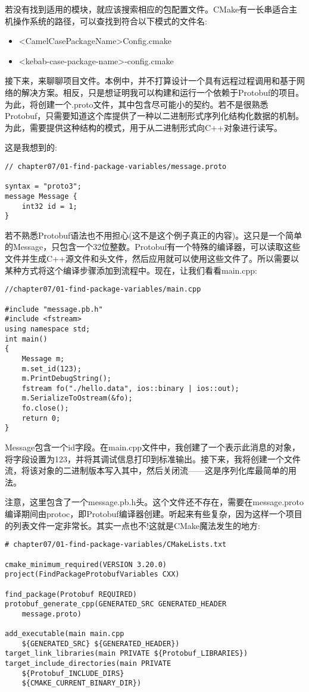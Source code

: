 若没有找到适用的模块，就应该搜索相应的包配置文件。CMake有一长串适合主机操作系统的路径，可以查找到符合以下模式的文件名:

\begin{itemize}
\item 
<CamelCasePackageName>Config.cmake

\item 
<kebab-case-package-name>-config.cmake
\end{itemize}

接下来，来聊聊项目文件。本例中，并不打算设计一个具有远程过程调用和基于网络的解决方案。相反，只是想证明我可以构建和运行一个依赖于Protobuf的项目。为此，将创建一个.proto文件，其中包含尽可能小的契约。若不是很熟悉Protobuf，只需要知道这个库提供了一种以二进制形式序列化结构化数据的机制。为此，需要提供这种结构的模式，用于从二进制形式向C++对象进行读写。

这是我想到的:

\begin{lstlisting}[style=styleCXX]
// chapter07/01-find-package-variables/message.proto

syntax = "proto3";
message Message {
	int32 id = 1;
}
\end{lstlisting}

若不熟悉Protobuf语法也不用担心(这不是这个例子真正的内容)。这只是一个简单的Message，只包含一个32位整数。Protobuf有一个特殊的编译器，可以读取这些文件并生成C++源文件和头文件，然后应用就可以使用这些文件了。所以需要以某种方式将这个编译步骤添加到流程中。现在，让我们看看main.cpp:

\begin{lstlisting}[style=styleCXX]
//chapter07/01-find-package-variables/main.cpp

#include "message.pb.h"
#include <fstream>
using namespace std;
int main()
{
	Message m;
	m.set_id(123);
	m.PrintDebugString();
	fstream fo("./hello.data", ios::binary | ios::out);
	m.SerializeToOstream(&fo);
	fo.close();
	return 0;
}
\end{lstlisting}

Message包含一个id字段。在main.cpp文件中，我创建了一个表示此消息的对象，将字段设置为123，并将其调试信息打印到标准输出。接下来，我将创建一个文件流，将该对象的二进制版本写入其中，然后关闭流——这是序列化库最简单的用法。

注意，这里包含了一个message.pb.h头。这个文件还不存在，需要在message.proto编译期间由protoc，即Protobuf编译器创建。听起来有些复杂，因为这样一个项目的列表文件一定非常长。其实一点也不!这就是CMake魔法发生的地方:

\begin{lstlisting}[style=styleCMake]
# chapter07/01-find-package-variables/CMakeLists.txt

cmake_minimum_required(VERSION 3.20.0)
project(FindPackageProtobufVariables CXX)

find_package(Protobuf REQUIRED)
protobuf_generate_cpp(GENERATED_SRC GENERATED_HEADER
	message.proto)

add_executable(main main.cpp
	${GENERATED_SRC} ${GENERATED_HEADER})
target_link_libraries(main PRIVATE ${Protobuf_LIBRARIES})
target_include_directories(main PRIVATE
	${Protobuf_INCLUDE_DIRS}
	${CMAKE_CURRENT_BINARY_DIR})
\end{lstlisting}

